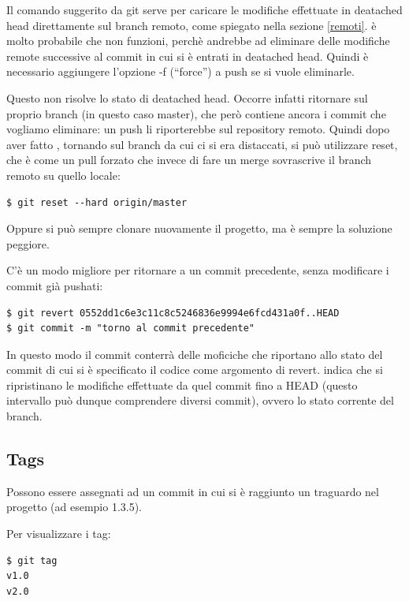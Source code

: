 \documentclass{article} \usepackage[textwidth=19cm,textheight=24cm]{geometry}
\begin{document}
Il comando suggerito da git serve per caricare le modifiche effettuate in deatached head
direttamente sul branch remoto, come spiegato nella sezione \ref{remoti}.
è molto probabile che non funzioni, perchè andrebbe ad
eliminare delle modifiche remote successive al commit in
cui si è entrati in deatached head. Quindi è necessario aggiungere l'opzione -f
(``force'') a push se si vuole eliminarle.

Questo non risolve lo stato di deatached head.
Occorre infatti ritornare sul proprio branch (in questo caso master),
che però contiene ancora i commit che vogliamo eliminare: un push li riporterebbe sul 
repository remoto.
Quindi dopo aver fatto , tornando sul branch da cui ci
si era distaccati, si può utilizzare reset, che è come un pull forzato che invece
di fare un merge sovrascrive il branch remoto su quello locale:

\begin{verbatim}
$ git reset --hard origin/master
\end{verbatim}

Oppure si può sempre clonare nuovamente il progetto, ma è sempre la soluzione
peggiore.

C'è un modo migliore per ritornare a un commit precedente, senza modificare i
commit già pushati:

\begin{verbatim}
$ git revert 0552dd1c6e3c11c8c5246836e9994e6fcd431a0f..HEAD
$ git commit -m "torno al commit precedente"
\end{verbatim}

In questo modo il commit  conterrà delle
moficiche che riportano allo stato del commit di cui si è specificato il codice
come argomento di revert.  indica che si ripristinano le modifiche
effettuate da quel commit fino a HEAD (questo intervallo può dunque comprendere
diversi commit), ovvero lo stato corrente del branch.

\subsection{Tags}

Possono essere assegnati ad un commit in cui si è raggiunto un traguardo nel
progetto (ad esempio 1.3.5).

Per visualizzare i tag:

\begin{verbatim}
$ git tag
v1.0
v2.0
\end{verbatim}
\end{document}
